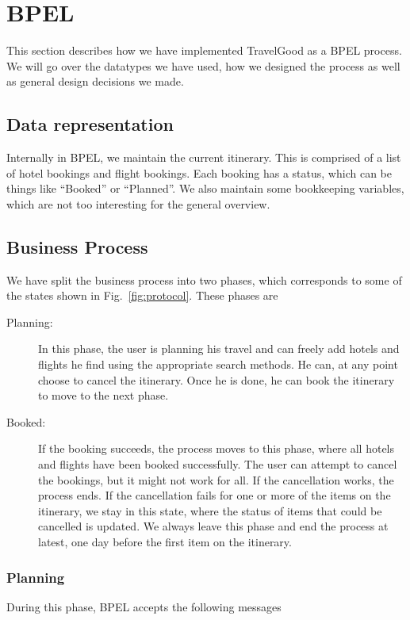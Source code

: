 \section{BPEL}
This section describes how we have implemented TravelGood as a BPEL process. We will go over the datatypes we have used, how we designed the process as well as general design decisions we made.

\subsection{Data representation}
Internally in BPEL, we maintain the current itinerary. This is comprised of a list of hotel bookings and flight bookings. Each booking has a status, which can be things like ``Booked'' or ``Planned''. We also maintain some bookkeeping variables, which are not too interesting for the general overview.

\subsection{Business Process}
We have split the business process into two phases, which corresponds to some of the states shown in Fig.~\ref{fig:protocol}. These phases are

\begin{description}
\item [Planning:] In this phase, the user is planning his travel and can freely add hotels and flights he find using the appropriate search methods. He can, at any point choose to cancel the itinerary. Once he is done, he can book the itinerary to move to the next phase.

\item[Booked:] If the booking succeeds, the process moves to this phase, where all hotels and flights have been booked successfully. The user can attempt to cancel the bookings, but it might not work for all. If the cancellation works, the process ends. If the cancellation fails for one or more of the items on the itinerary, we stay in this state, where the status of items that could be cancelled is updated. We always leave this phase and end the process at latest, one day before the first item on the itinerary.

\end{description}

\subsubsection{Planning}
During this phase, BPEL accepts the following messages

